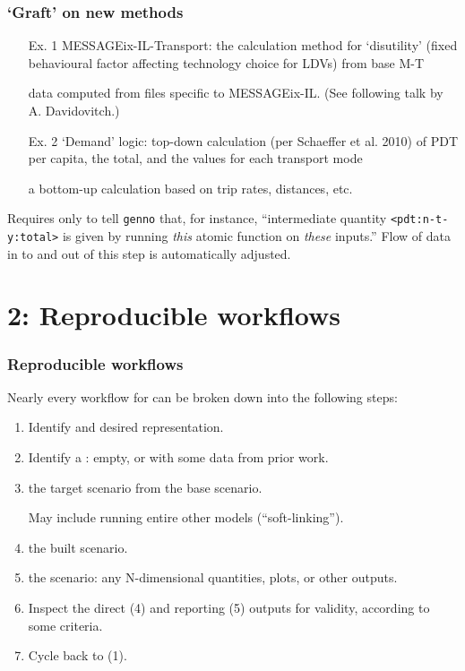\documentclass[12pt,aspectratio=169]{beamer}
\begin{document}
\begin{frame}
\frametitle{‘Graft’ on new methods}

\begin{enumerate}
  \item [Ex. 1] MESSAGEix-IL-Transport:  the calculation method for ‘disutility’ (fixed behavioural factor affecting technology choice for LDVs) from base M-T

   data computed from files specific to MESSAGEix-IL. (See following talk by A. Davidovitch.)
  \item [Ex. 2] ‘Demand’ logic:  top-down calculation (per Schaeffer et al. 2010) of PDT per capita, the total, and the values for each transport mode

   a bottom-up calculation based on trip rates, distances, etc.
\end{enumerate}

\bigskip
Requires only to tell \texttt{genno} that, for instance, “intermediate quantity \texttt{<pdt:n-t-y:total>} is given by running \emph{this} atomic function on \emph{these} inputs.”
Flow of data in to and out of this step is automatically adjusted.
\end{frame}

\section{2: Reproducible workflows}

\begin{frame}
\frametitle{Reproducible workflows}

Nearly every workflow for  can be broken down into the following steps:

\bigskip
\begin{enumerate}
  \item Identify  and desired representation.
  \item Identify a : empty, or with some data from prior work.
  \item {} the target scenario from the base scenario.

  May include running entire other models (“soft-linking”).
  \item {} the built scenario.
  \item {} the scenario: any N-dimensional quantities, plots, or other outputs.
  \item Inspect the direct (4) and reporting (5) outputs for validity, according to some criteria.
  \item Cycle back to (1).
\end{enumerate}

\end{frame}
\end{document}
